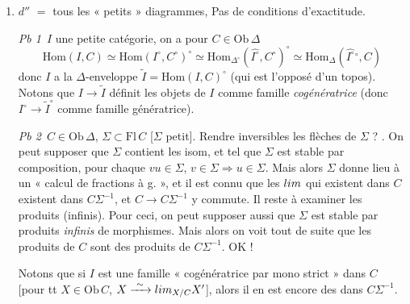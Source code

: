 \documentclass[11pt,a4paper]{article}
\begin{document}
\begin{enumerate}
  \item[(2)] $d''$ $=$ tous les « petits » diagrammes,  Pas de conditions d'exactitude.

    \emph{Pb 1}\ $I$ une petite catégorie, on a pour $C \in
    \mathrm{Ob}\,\Delta$
    \[
      \mathrm{Hom}(I, C) \simeq \mathrm{Hom}(I^{\circ}, C^{\circ})^{\circ}
      \simeq \mathrm{Hom}_{\Delta^{\circ}}(\widehat{I^{\circ}},
      C^{\circ})^{\circ} \simeq \mathrm{Hom}_{\Delta}
      (\widehat{I^{\circ}}{}^{\circ}, C)
    \]
     donc $I$ a la
    $\Delta$-enveloppe $\tilde{I} = \mathrm{Hom}(I, C)^{\circ}$ (qui est
    l'opposé d'un topos).  Notons que $I \to \tilde{I}$ définit
    les objets de $I$ comme famille \emph{cogénératrice} (donc
    $I^{\circ} \to \tilde{I}^{\circ}$ comme famille génératrice).

    \emph{Pb 2}\ $C \in \mathrm{Ob}\,\Delta$, $\Sigma \subset
    \mathrm{Fl}\,C$ [$\Sigma$ petit]. Rendre inversibles les flèches de
    $\Sigma$ ? .  On peut supposer que $\Sigma$
    contient les isom, et tel que  $\Sigma$ est stable par composition, pour chaque
    \ill{} $vu \in \Sigma$, $v \in \Sigma \Rightarrow u \in \Sigma$. Mais
    alors $\Sigma$ donne lieu à un « calcul de fractions à g. », et il
    est connu  que les $\varprojlim$  qui existent dans $C$ existent dans
    $C\Sigma^{-1}$, et $C \to C\Sigma^{-1}$ y commute. Il reste à examiner
    les produits (infinis). Pour ceci, on peut supposer aussi que
    $\Sigma$ est stable par produits \emph{infinis} de morphismes.
    Mais alors on voit tout de suite que les produits de $C$ sont des
    produits de $C\Sigma^{-1}$. OK !

    Notons que si $I$ est une famille « cogénératrice par mono strict »
    dans \struck{\ill{}} $C$ [pour tt $X \in \mathrm{Ob}\,C$, $X
    \xrightarrow{\ \sim\ } \varprojlim_{X/C} X'$], alors il en est
    encore des \uncertain{$\varprojlim$} dans $C\Sigma^{-1}$.


\end{enumerate}
\end{document}
